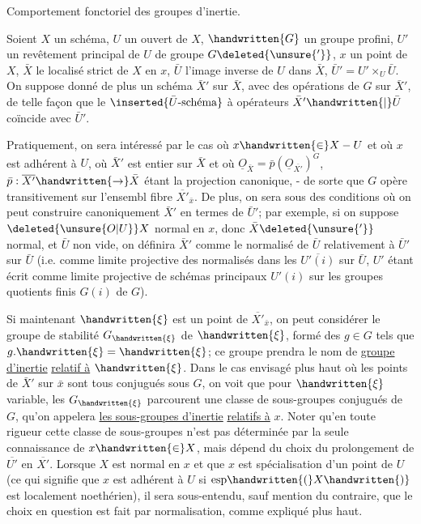Comportement fonctoriel des groupes d'inertie.

 Soient $X$ un schéma, $U$ un ouvert de $X$, $\handwritten{G}$ un groupe profini, $U'$ un
revêtement principal de $U$ de groupe $G\deleted{\unsure{'}}$, $x$ un point  de $X$, $\bar X$ le localisé
strict de $X$ en $x$, $\bar U$ l'image inverse de $U$ dans $\bar X$, $\bar U'=U'\times_U\bar U$. On suppose
donné de plus un schéma $\bar X'$ sur $\bar X$, avec des opérations de $G$ sur $\bar X'$, de
telle façon que le $\inserted{\bar U\text{-schéma}}$ à opérateurs $\bar X'\handwritten{\mid}\bar U$ coïncide avec $\bar U'$.

Pratiquement, on sera intéressé par le cas où $x\handwritten{\in}X-U$ et où $x$ est
adhérent à $U$, où $\bar X'$ est entier sur $\bar X$ et où $\underline O_{\bar X}=\bar p(\underline O_{\overline{X'}})^G$, $\bar p:\overline{X'}\handwritten{\to}\bar X$ étant
la projection canonique, - de sorte que $G$ opère transitivement sur
l'ensembl fibre $\overline{X'}_{\bar x}$. De plus, on  sera  sous des conditions où
on peut construire canoniquement $\bar X'$ en termes de $\bar U'$; par exemple, si on
suppose $\deleted{\unsure{O|U}}X$ normal en $x$, donc $\bar X\deleted{\unsure{'}}$ normal, et $\bar U$ non vide, on définira $\bar X'$ comme
le normalisé de $\bar U$ relativement à $\bar U'$ sur $\bar U$ (i.e. comme limite projective
des normalisés dans les $\overline{U'(i)}$ sur $\bar U$, $U'$ étant écrit comme limite projective de schémas principaux $U'(i)$ sur les groupes quotients finis $G(i)$ de
$G$).

Si maintenant  $\handwritten{\xi}$ est un point de $\overline{X'}_{\bar x}$, on peut considérer le
groupe de stabilité $G_{\handwritten{\xi}}$ de $\handwritten{\xi}$, formé des $g\in G$ tels que $g.\handwritten{\xi}=\handwritten{\xi}$; ce groupe
prendra le nom de \uline{groupe d'inertie} \uline{relatif à} $\handwritten{\xi}$. Dans le cas envisagé plus
haut où les points de $\bar X'$ sur $\bar x$ sont tous conjugués sous $G$, on voit que
pour $\handwritten{\xi}$ variable, les $G_{\handwritten{\xi}}$ parcourent une classe de sous-groupes conjugués
de $G$, qu'on appelera  \uline{les sous-groupes d'inertie}  \uline{relatifs à} $x$. Noter
qu'en toute rigueur cette classe de sous-groupes  n'est pas
déterminée par la seule connaissance de $x\handwritten{\in}X$, mais dépend du choix du
prolongement de $\overline{U'}$ en $\overline{X'}$. Lorsque $X$ est normal en $x$ et que $x$ est spécialisation d'un point de $U$ (ce qui signifie que $x$ est adhérent à $U$ si $\mathrm{esp}\handwritten{(}X\handwritten{)}$
est localement noethérien), il sera sous-entendu, \deleted{\unsure{-}}sauf mention du contraire, que le choix en question est fait par normalisation, comme expliqué
plus haut.
